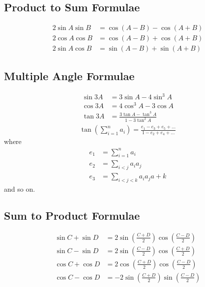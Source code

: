 \documentclass[12pt]{article}
\newcommand{\pwidth}{0.46\linewidth}
\begin{document}
\begin{minipage}[t]{\pwidth}
		\subsection{Product to Sum Formulae}
		\begin{align}
			2\sin A \sin B &= \cos(A-B) - \cos(A+B) \\
			2\cos A \cos B &= \cos(A-B) + \cos(A+B) \\
			2\sin A \cos B &= \sin(A-B) + \sin(A+B)
		\end{align}
	\end{minipage}%
	\hfill
	\begin{minipage}[t]{\pwidth}
		\subsection{Multiple Angle Formulae}
		\begin{align}
			\sin 3A &= 3\sin A - 4\sin^3A \\
			\cos 3A &= 4\cos^3A - 3\cos A \\
			\tan 3A &= \frac{3\tan A - \tan^3A}{1 - 3\tan^2A}
		\end{align}
		\begin{align}
			\tan\left(\displaystyle \sum_{i=1}^n a_i\right) = \frac{e_1 - e_3 + e_5 + ...}{1 - e_2 + e_4 + ...}
		\end{align}
		where \vspace{-10pt}
		\begin{align}
			e_1 &= \displaystyle \sum_{i=1}^n a_i \nonumber\\
			e_2 &= \displaystyle \sum_{i < j} a_i a_j \nonumber\\
			e_3 &= \displaystyle \sum_{i < j < k} a_i a_j a+k \nonumber
		\end{align}
		and so on.

		\subsection{Sum to Product Formulae}
		\begin{align}
			\sin C + \sin D &= 2\sin\left(\frac{C+D}2\right)\cos\left(\frac{C-D}2\right) \\
			\sin C - \sin D &= 2\sin\left(\frac{C-D}2\right)\cos\left(\frac{C+D}2\right) \\
			\cos C + \cos D &= 2\cos\left(\frac{C+D}2\right)\cos\left(\frac{C-D}2\right) \\
			\cos C - \cos D &= -2\sin\left(\frac{C+D}2\right)\sin\left(\frac{C-D}2\right)
		\end{align}


\end{minipage}
\end{document}
